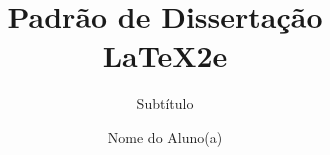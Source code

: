 \title{Padrão de Dissertação \texorpdfstring{\\ \LaTeX2e}{LaTeX2e}}

\subtitle{Subtítulo}

\author{Nome do Aluno(a)}













\renewcommand{\submissiontext}{Dissertação apresentada como requisito parcial para obtenção do grau de}

